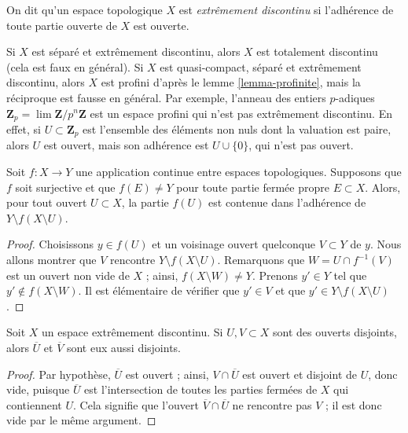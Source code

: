 \begin{definition}
\label{definition-extremally-disconnected}
On dit qu'un espace topologique $X$ est {\it extrêmement discontinu}
si l'adhérence de toute partie ouverte de $X$ est ouverte.
\end{definition}

\noindent
Si $X$ est séparé et extrêmement discontinu, alors $X$ est totalement
discontinu (cela est faux en général). Si $X$ est quasi-compact, séparé et
extrêmement discontinu, alors $X$ est profini d'après le
lemme \ref{lemma-profinite}, mais la réciproque est fausse en général.
Par exemple, l'anneau des entiers $p$-adiques
$\mathbf{Z}_p = \lim \mathbf{Z}/p^n\mathbf{Z}$ est un espace profini
qui n'est pas extrêmement discontinu. En effet, si $U \subset \mathbf{Z}_p$
est l'ensemble des éléments non nuls dont la valuation est paire, alors $U$ est
ouvert, mais son adhérence est $U \cup \{0\}$, qui n'est pas ouvert.

\begin{lemma}
\label{lemma-image-open-technical}
Soit $f : X \to Y$ une application continue entre espaces topologiques.
Supposons que $f$ soit surjective et que $f(E) \not = Y$ pour toute partie
fermée propre $E \subset X$. Alors, pour tout ouvert $U \subset X$, la partie
$f(U)$ est contenue dans l'adhérence de $Y \setminus f(X \setminus U)$.
\end{lemma}

\begin{proof}
Choisissons $y \in f(U)$ et un voisinage ouvert quelconque $V \subset Y$ de
$y$. Nous allons montrer que $V$ rencontre $Y \setminus f(X \setminus U)$.
Remarquons que $W = U \cap f^{-1}(V)$ est un ouvert non vide de $X$ ; ainsi,
$f(X \setminus W) \not = Y$. Prenons $y' \in Y$ tel que
$y' \not \in f(X \setminus W)$. Il est élémentaire de vérifier que $y' \in V$
et que $y' \in Y \setminus f(X \setminus U)$.
\end{proof}

\begin{lemma}
\label{lemma-intersection-empty}
Soit $X$ un espace extrêmement discontinu.
Si $U, V \subset X$ sont des ouverts disjoints, alors
$\overline{U}$ et $\overline{V}$ sont eux aussi disjoints.
\end{lemma}

\begin{proof}
Par hypothèse, $\overline{U}$ est ouvert ; ainsi,
$V \cap \overline{U}$ est ouvert et disjoint de $U$, donc vide, puisque
$\overline{U}$ est l'intersection de toutes les parties fermées de $X$ qui
contiennent $U$. Cela signifie que l'ouvert
$\overline{V} \cap \overline{U}$ ne rencontre pas $V$ ; il est donc vide par
le même argument.
\end{proof}

